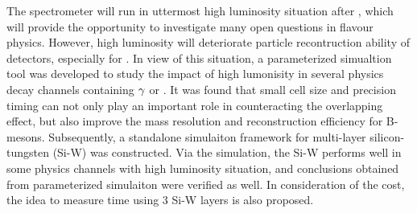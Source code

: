 \begin{eabstract}
The \lhcb spectrometer will run in uttermost high luminosity situation after \upgradetwo, 
which will provide the opportunity to investigate many open questions in flavour physics.
However,
high luminosity will deteriorate particle recontruction ability of \lhcb detectors,
especially for \ecal.
In view of this situation,
a parameterized simualtion tool was developed to study the impact of high lumonisity in several physics decay channels containing ${\gamma}$ or \piz.
It was found that small cell size and precision timing can not only play an important role in counteracting the overlapping effect,
but also improve the mass resolution and reconstruction efficiency for B-mesons.
Subsequently,
a standalone simulaiton framework for multi-layer silicon-tungsten (Si-W) \ecal was constructed.
Via the simulation,
the Si-W \ecal performs well in some physics channels with high luminosity situation,
and conclusions obtained from parameterized simulaiton were verified as well.
In consideration of the cost,
the idea to measure time using 3 Si-W layers is also proposed.   



\end{eabstract}











